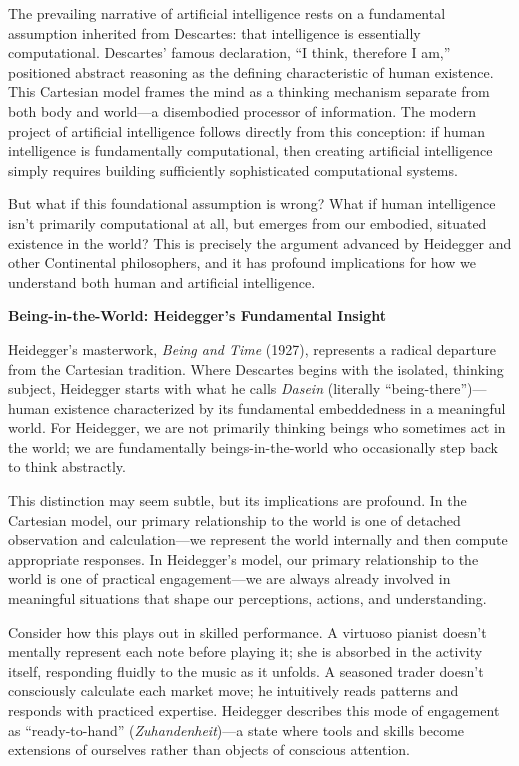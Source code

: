 \documentclass[
  Letterpaper,
]{scrbook}
\begin{document}
The prevailing narrative of artificial intelligence rests on a
fundamental assumption inherited from Descartes: that intelligence is
essentially computational. Descartes' famous declaration, ``I think,
therefore I am,'' positioned abstract reasoning as the defining
characteristic of human existence. This Cartesian model frames the mind
as a thinking mechanism separate from both body and world---a
disembodied processor of information. The modern project of artificial
intelligence follows directly from this conception: if human
intelligence is fundamentally computational, then creating artificial
intelligence simply requires building sufficiently sophisticated
computational systems.

But what if this foundational assumption is wrong? What if human
intelligence isn't primarily computational at all, but emerges from our
embodied, situated existence in the world? This is precisely the
argument advanced by Heidegger and other Continental philosophers, and
it has profound implications for how we understand both human and
artificial intelligence.

\textbf{Being-in-the-World: Heidegger's Fundamental Insight}

Heidegger's masterwork, \emph{Being and Time} (1927), represents a
radical departure from the Cartesian tradition. Where Descartes begins
with the isolated, thinking subject, Heidegger starts with what he calls
\emph{Dasein} (literally ``being-there'')---human existence
characterized by its fundamental embeddedness in a meaningful world. For
Heidegger, we are not primarily thinking beings who sometimes act in the
world; we are fundamentally beings-in-the-world who occasionally step
back to think abstractly.

This distinction may seem subtle, but its implications are profound. In
the Cartesian model, our primary relationship to the world is one of
detached observation and calculation---we represent the world internally
and then compute appropriate responses. In Heidegger's model, our
primary relationship to the world is one of practical engagement---we
are always already involved in meaningful situations that shape our
perceptions, actions, and understanding.

Consider how this plays out in skilled performance. A virtuoso pianist
doesn't mentally represent each note before playing it; she is absorbed
in the activity itself, responding fluidly to the music as it unfolds. A
seasoned trader doesn't consciously calculate each market move; he
intuitively reads patterns and responds with practiced expertise.
Heidegger describes this mode of engagement as ``ready-to-hand''
(\emph{Zuhandenheit})---a state where tools and skills become extensions
of ourselves rather than objects of conscious attention.
\end{document}
